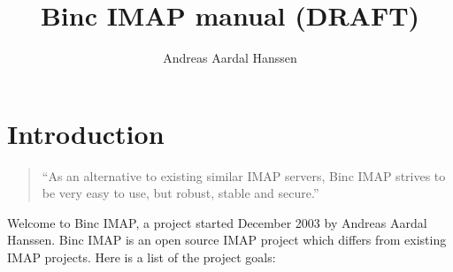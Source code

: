 \documentclass[11pt,a4paper,twoside,openright]{report}
\begin{document}
\title{Binc IMAP manual (DRAFT)}
\author{Andreas Aardal Hanssen}

\maketitle
\tableofcontents

\chapter[Introducing Binc IMAP]{Introduction}

\begin{quote}
``As an alternative to existing similar IMAP servers, Binc IMAP
strives to be very easy to use, but robust, stable and secure.''
\end{quote}
Welcome to Binc IMAP, a project started December 2003 by Andreas
Aardal Hanssen. Binc IMAP is an open source IMAP project which differs
from existing IMAP projects. Here is a list of the project goals:
\end{document}
